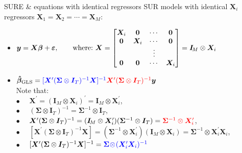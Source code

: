 \documentclass[usenames,dvipsnames]{beamer}
\begin{document}
\begin{frame}{SURE \& equations with identical regressors}
\small
SUR models with identical $\bm{X}_i$ regressors $\bm{X}_1=\bm{X}_2=\cdots=\bm{X}_M$:\\ \bigskip
\begin{itemize}
    \item $\bm{y} = \bm{X\beta}+\bm{\varepsilon},\qquad \textnormal{where:~} \bm{X}=
    \begin{bmatrix} 
    \bm{X}_i & \bm{0} & \cdots & \bm{0} \\ 
    \bm{0} & \bm{X}_i & \cdots & \bm{0} \\ 
      &   & \vdots &  \\ 
    \bm{0} & \bm{0} & \cdots & \bm{X}_i \\ 
    \end{bmatrix} = \bm{I}_{\!M} \otimes \bm{X}_i$
    \bigskip
    \item $\bm{\hat{\beta}}_{\textnormal{GLS}} = \textcolor{blue}{[\bm{X}^{\prime} (\bm{\Sigma} \otimes \bm{I}_T)^{-1} \bm{X}]^{-1}} \textcolor{red}{\bm{X}^{\prime} (\bm{\Sigma} \otimes \bm{I}_T)^{-1}} \bm{y}$ \\ \medskip
    \quad Note that: \\ \smallskip
    \quad $\bullet$~~ $\bm{X}^{\prime} = (\bm{I}_{\!M} \otimes \bm{X}_i)^{\prime} = \bm{I}_{\!M} \otimes \bm{X}_i^{\prime}$,\\ \smallskip 
    \quad $\bullet$~~ $(\bm{\Sigma} \otimes \bm{I}_T)^{-1} = \bm{\Sigma}^{-1} \otimes \bm{I}_T$, \\ \smallskip
    \quad $\bullet$~~ $\bm{X}^{\prime} (\bm{\Sigma} \otimes \bm{I}_T)^{-1} = (\bm{I}_{\!M} \otimes \bm{X}_i^{\prime}) (\bm{\Sigma}^{-1} \otimes \bm{I}_T) = \textcolor{red}{\bm{\Sigma}^{-1} \otimes \bm{X}_i^{\prime}}$,\\ \bigskip 
    \quad $\bullet$~~ $[\bm{X}^{\prime} (\bm{\Sigma} \otimes \bm{I}_T)^{-1} \bm{X}] = (\bm{\Sigma}^{-1} \! \otimes \! \bm{X}_i^{\prime})(\bm{I}_{\!M} \! \otimes \! \bm{X}_i) = \bm{\Sigma}^{-1} \! \otimes \! \bm{X}_i^{\prime}\bm{X}_i $,\\ \smallskip
    \quad $\bullet$~~ $[\bm{X}^{\prime} (\bm{\Sigma} \otimes \bm{I}_T)^{-1} \bm{X}]^{-1} = \textcolor{blue}{\bm{\Sigma} \! \otimes \! (\bm{X}_i^{\prime}\bm{X}_i)^{-1}}$
\end{itemize}
\end{frame}
\end{document}
